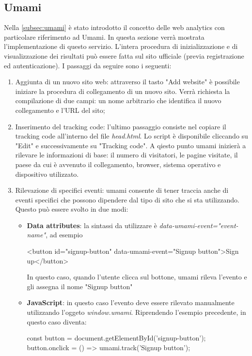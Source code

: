 \documentclass[target=bach,aauheader=]{thud}
\begin{document}
\subsection{Umami}
Nella \cref{subsec:umami} è stato introdotto il concetto delle web analytics con particolare riferimento ad Umami. In questa sezione verrà mostrata l'implementazione di questo servizio. 
\newline \newline
L'intera procedura di inizializzazione e di visualizzazione dei risultati può essere fatta sul sito ufficiale (previa registrazione ed autenticazione). I passaggi da seguire sono i seguenti:
\begin{enumerate}
    \item Aggiunta di un nuovo sito web: attraverso il tasto "Add website" è possibile iniziare la procedura di collegamento di un nuovo sito. 
          Verrà richiesta la compilazione di due campi: un nome arbitrario che identifica il nuovo collegamento e l'URL del sito;
    \item Inserimento del tracking code: l'ultimo passaggio consiste nel copiare il tracking code all'interno del file \textit{head.html}. Lo script è disponibile cliccando su "Edit" e successivamente su "Tracking code".
          A qiesto punto umami inizierà a rilevare le informazioni di base: il numero di visitatori, le pagine visitate, il paese da cui è avvenuto il collegamento, browser, sistema operativo e dispositivo utilizzato.
    \item Rilevazione di specifici eventi: umami consente di tener traccia anche di eventi specifici che possono dipendere dal tipo di sito che si sta utilizzando. Questo può essere svolto in due modi:
    \begin{itemize}
        \item \textbf{Data attributes}: la sintassi da utilizzare è \textit{data-umami-event="{event-name}"}, ad esempio 
        \begin{center}
        <button id="signup-button" data-umami-event="Signup button">Sign up</button>
        \end{center}
        In questo caso, quando l'utente clicca sul bottone, umami rileva l'evento e gli assegna il nome "Signup button"
        \item \textbf{JavaScript}: in questo caso l'evento deve essere rilevato manualmente utilizzando l'oggeto \textit{window.umami}. Riprendendo l'esempio precedente, in questo caso diventa:
        \begin{center}
            const button = document.getElementById('signup-button');
            \newline
            button.onclick = () => umami.track('Signup button');
        \end{center}
    \end{itemize}
\end{enumerate}
\end{document}
